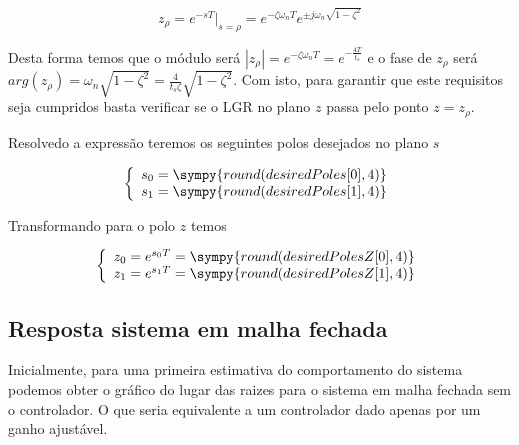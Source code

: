 \documentclass[a4paper,11pt]{article}
\begin{document}
\begin{equation}
    z_{\rho} = e^{-sT}|_{s=\rho} =  e^{-\zeta\omega_n T} e^{\pm j\omega_n\sqrt{1-\zeta^2}}
\end{equation}

Desta forma temos que o módulo será $|z_{\rho}| =  e^{-\zeta\omega_n T} = e^{-\frac{4T}{t_s}}$ e o fase de $z_\rho$ será $arg(z_{\rho}) = \omega_n\sqrt{1-\zeta^2} = \frac{4}{t_s\zeta}\sqrt{1-\zeta^2}$. Com isto, para garantir que este requisitos seja cumpridos basta verificar se o LGR no plano $z$ passa pelo ponto $z = z_{\rho}$.

Resolvedo a expressão teremos os seguintes polos desejados no plano $s$

$$
\left\{
\begin{array}{l}
    s_0 = \sympy{round(desiredPoles[0],4)}\\
    s_1 = \sympy{round(desiredPoles[1],4)}
\end{array}
\right.
$$

Transformando para o polo $z$ temos

$$
\left\{
\begin{array}{l}
    z_0 = e^{s_0 T} = \sympy{round(desiredPolesZ[0],4)}\\
    z_1 = e^{s_1 T} = \sympy{round(desiredPolesZ[1],4)}
\end{array}
\right.
$$

\subsection{Resposta sistema em malha fechada}


Inicialmente, para uma primeira estimativa do comportamento do sistema podemos obter o gráfico do lugar das raizes para o sistema em malha fechada sem o controlador. O que seria equivalente a um controlador dado apenas por um ganho ajustável.
\end{document}

